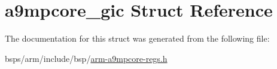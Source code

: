 \hypertarget{structa9mpcore__gic}{}\section{a9mpcore\+\_\+gic Struct Reference}
\label{structa9mpcore__gic}


The documentation for this struct was generated from the following file\+:\begin{DoxyCompactItemize}
\item 
bsps/arm/include/bsp/\mbox{\hyperlink{arm-a9mpcore-regs_8h}{arm-\/a9mpcore-\/regs.\+h}}\end{DoxyCompactItemize}
